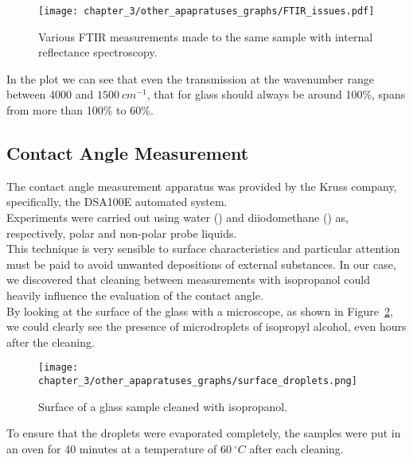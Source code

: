 \begin{figure}[H]
    \centering
    \texttt{[image: chapter\_3/other\_apapratuses\_graphs/FTIR\_issues.pdf]} 
    \vspace*{-30pt}
    \caption{Various FTIR measurements made to the same sample with internal reflectance spectroscopy.}
    \label{fig:ftir_issues}
\end{figure}

In the plot we can see that even the transmission at the wavenumber range between 4000 and $1500\: cm^{-1}$, that for glass should always be around 100\%, spans from more than 100\% to 60\%.

\subsection{Contact Angle Measurement}
\label{subsec:contact_angle_setup}
The contact angle measurement apparatus was provided by the Kruss company, specifically, the DSA100E automated system.
\\
Experiments were carried out using water () and diiodomethane () as, respectively, polar and non-polar probe liquids.
\\
This technique is very sensible to surface characteristics and particular attention must be paid to avoid unwanted depositions of external substances. In our case, we discovered that cleaning between measurements with isopropanol could heavily influence the evaluation of the contact angle.  
\\ 
By looking at the surface of the glass with a microscope, as shown in Figure~\ref{fig:surface_droplets}, we could clearly see the presence of microdroplets of isopropyl alcohol, even hours after the cleaning. 

\begin{figure}[H]
    \centering
    \texttt{[image: chapter\_3/other\_apapratuses\_graphs/surface\_droplets.png]} 
    \caption{Surface of a glass sample cleaned with isopropanol.}
    \label{fig:surface_droplets}
\end{figure}

To ensure that the droplets were evaporated completely, the samples were put in an oven for 40 minutes at a temperature of $60\: ^{\circ} C$ after each cleaning.

